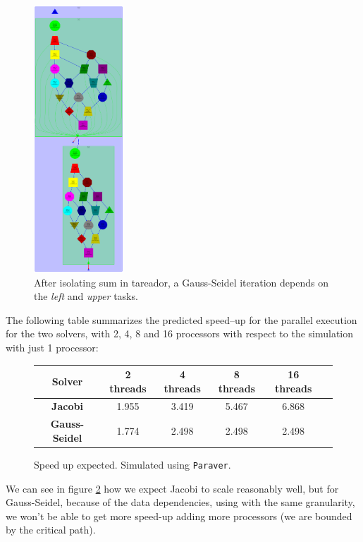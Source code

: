 \documentclass[a4paper,11pt]{article}
\begin{document}
\begin{figure}[h!]
  \center
  \includegraphics[height=10cm,clip=true,trim=0cm 2cm 9cm 0cm]{figs/dependencies_gs.pdf}
  \caption{After isolating sum in tareador, a Gauss-Seidel iteration
    depends on the \emph{left} and \emph{upper} tasks.}
  \label{fig:gs-deps}
\end{figure}

\newpage
The following table summarizes the predicted speed–up for the parallel
execution for the two solvers, with 2, 4, 8 and 16 processors with
respect to the simulation with just 1 processor:

\begin{figure}[h!]
\begin{tabular}{| c || c | c | c | c | c |}
\hline
\textbf{\textbf{Solver}} & \textbf{2 threads} & \textbf{4 threads} & \textbf{8 threads} & \textbf{16 threads}
\\
\hline
\hline
\textbf{Jacobi} & 1.955 & 3.419 & 5.467 & 6.868
\\
\hline
\textbf{Gauss-Seidel} & 1.774 & 2.498 & 2.498 & 2.498
\\
\hline
\end{tabular}
\caption{Speed up expected. Simulated using \texttt{Paraver}.}
\label{speed-up}
\end{figure}

We can see in figure \ref{speed-up} how we expect Jacobi to scale
reasonably well, but for Gauss-Seidel, because of the data
dependencies, using with the same granularity, we won't be able to get
more speed-up adding more processors (we are bounded by the critical
path).
\newpage
\end{document}
